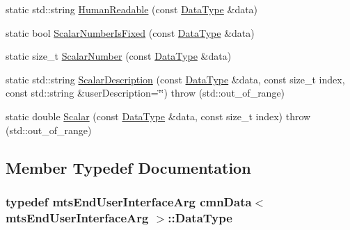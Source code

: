 \begin{DoxyCompactItemize}
\item 
static std\-::string \hyperlink{classcmn_data_3_01mts_end_user_interface_arg_01_4_ada93bf426247fab620641219c28ba712}{Human\-Readable} (const \hyperlink{classcmn_data_3_01mts_end_user_interface_arg_01_4_aedf4f6543ddf0d9a93eeb4825c17a9e8}{Data\-Type} \&data)
\item 
static bool \hyperlink{classcmn_data_3_01mts_end_user_interface_arg_01_4_a4260ef19141a6cec75d69bfa86ea948e}{Scalar\-Number\-Is\-Fixed} (const \hyperlink{classcmn_data_3_01mts_end_user_interface_arg_01_4_aedf4f6543ddf0d9a93eeb4825c17a9e8}{Data\-Type} \&data)
\item 
static size\-\_\-t \hyperlink{classcmn_data_3_01mts_end_user_interface_arg_01_4_a72a5757f60e76af71cb2af9c1fb9141e}{Scalar\-Number} (const \hyperlink{classcmn_data_3_01mts_end_user_interface_arg_01_4_aedf4f6543ddf0d9a93eeb4825c17a9e8}{Data\-Type} \&data)
\item 
static std\-::string \hyperlink{classcmn_data_3_01mts_end_user_interface_arg_01_4_a46dde16f2f0cf6ee9a2a830ccafe99b0}{Scalar\-Description} (const \hyperlink{classcmn_data_3_01mts_end_user_interface_arg_01_4_aedf4f6543ddf0d9a93eeb4825c17a9e8}{Data\-Type} \&data, const size\-\_\-t index, const std\-::string \&user\-Description=\char`\"{}\char`\"{})  throw (std\-::out\-\_\-of\-\_\-range)
\item 
static double \hyperlink{classcmn_data_3_01mts_end_user_interface_arg_01_4_a65e442158c0fcbc145eff6ad4842d1e5}{Scalar} (const \hyperlink{classcmn_data_3_01mts_end_user_interface_arg_01_4_aedf4f6543ddf0d9a93eeb4825c17a9e8}{Data\-Type} \&data, const size\-\_\-t index)  throw (std\-::out\-\_\-of\-\_\-range)
\end{DoxyCompactItemize}


\subsection{Member Typedef Documentation}
\hypertarget{classcmn_data_3_01mts_end_user_interface_arg_01_4_aedf4f6543ddf0d9a93eeb4825c17a9e8}{
\subsubsection[{Data\-Type}]{\setlength{\rightskip}{0pt plus 5cm}typedef {\bf mts\-End\-User\-Interface\-Arg} {\bf cmn\-Data}$<$ {\bf mts\-End\-User\-Interface\-Arg} $>$\-::{\bf Data\-Type}}}\label{classcmn_data_3_01mts_end_user_interface_arg_01_4_aedf4f6543ddf0d9a93eeb4825c17a9e8}


